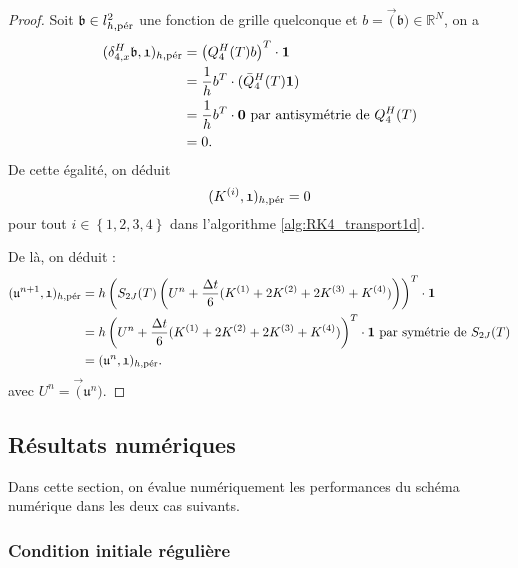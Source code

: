 \begin{proof}
Soit $\mathfrak{b} \in l^2_{h,\per}$ une fonction de grille quelconque et $b=\vec(\mathfrak{b}) \in \mathbb{R}^N$, on a
\begin{align*}
(\delta_{4,x}^H \mathfrak{b}, \mathfrak{1})_{h,\per} & = \left( Q_4^H(T) b \right)^T \cdot \mathbf{1} \\
	& = \dfrac{1}{h} b^T \cdot (\bar{Q}_4^H(T) \mathbf{1}) \\
	& = \dfrac{1}{h} b^T \cdot \mathbf{0} \text{ par antisymétrie de }Q_4^H(T)\\
	& = 0.
\end{align*}
De cette égalité, on déduit
\begin{equation}
(K^{(i)}, \mathfrak{1})_{h,\per} = 0
\end{equation}
pour tout $i \in \left\lbrace 1, 2, 3, 4 \right\rbrace$ dans l'algorithme \ref{alg:RK4_transport1d}.

De là, on déduit :
\begin{align*}
(\mathfrak{u}^{n+1},\mathfrak{1})_{h,\per} & = h \left( S_{2J}(T) \left( U^n + \dfrac{\Delta t}{6}(K^{(1)}+2K^{(2)}+2K^{(3)}+K^{(4)})  \right) \right)^T \cdot \mathbf{1} \\
	& = h \left( U^n + \dfrac{\Delta t}{6}(K^{(1)}+2K^{(2)}+2K^{(3)}+K^{(4)})  \right)^T \cdot \mathbf{1} \text{ par symétrie de } S_{2J}(T)\\
	& = (\mathfrak{u}^n , \mathfrak{1})_{h,\per}.
\end{align*}
avec $U^n = \vec(\mathfrak{u}^n)$.
\end{proof}












\subsection{Résultats numériques}

Dans cette section, on évalue numériquement les performances du schéma numérique dans les deux cas suivants.

\subsubsection{Condition initiale régulière}

